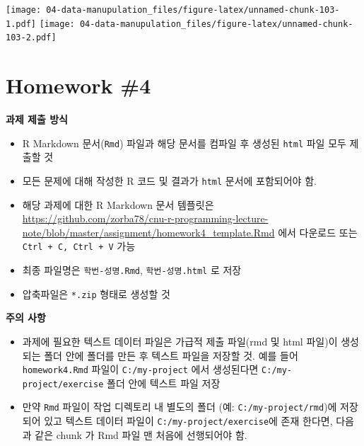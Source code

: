 \documentclass[
  11pt,
]{krantz}
\newenvironment{Shaded}{\begin{snugshade}}{\end{snugshade}}
\newcommand{\BaseNTok}[1]{\textcolor[rgb]{0.06,0.06,0.06}{#1}}
\providecommand{\tightlist}{%
  \setlength{\itemsep}{0pt}\setlength{\parskip}{0pt}}
\let\BeginKnitrBlock\begin \let\EndKnitrBlock\end
\begin{document}
\texttt{[image: 04-data-manupulation\_files/figure-latex/unnamed-chunk-103-1.pdf]} \texttt{[image: 04-data-manupulation\_files/figure-latex/unnamed-chunk-103-2.pdf]}

\normalsize

\hypertarget{homework-04}{%
\section{Homework \#4}\label{homework-04}}

\footnotesize

\BeginKnitrBlock{rmdimportant}
\textbf{과제 제출 방식}

\begin{itemize}
\tightlist
\item
  R Markdown 문서(\texttt{Rmd}) 파일과 해당 문서를 컴파일 후 생성된 \texttt{html} 파일 모두 제출할 것
\item
  모든 문제에 대해 작성한 R 코드 및 결과가 \texttt{html} 문서에 포함되어야 함.
\item
  해당 과제에 대한 R Markdown 문서 템플릿은 \url{https://github.com/zorba78/cnu-r-programming-lecture-note/blob/master/assignment/homework4_template.Rmd} 에서 다운로드 또는 \texttt{Ctrl\ +\ C,\ Ctrl\ +\ V} 가능
\item
  최종 파일명은 \texttt{학번-성명.Rmd}, \texttt{학번-성명.html} 로 저장
\item
  압축파일은 \texttt{*.zip} 형태로 생성할 것
\end{itemize}

\textbf{주의 사항}

\begin{itemize}
\tightlist
\item
  과제에 필요한 텍스트 데이터 파일은 가급적 제출 파일(rmd 및 html 파일)이 생성되는 폴더 안에 폴더를 만든 후 텍스트 파일을 저장할 것. 예를 들어 \texttt{homework4.Rmd} 파일이 \texttt{C:/my-project} 에서 생성된다면 \texttt{C:/my-project/exercise} 폴더 안에 텍스트 파일 저장
\item
  만약 \texttt{Rmd} 파일이 작업 디렉토리 내 별도의 폴더 (예: \texttt{C:/my-project/rmd})에 저장되어 있고 텍스트 데이터 파일이 \texttt{C:/my-project/exercise}에 존재 한다면, 다음과 같은 chunk 가 Rmd 파일 맨 처음에 선행되어야 함.
\end{itemize}
\EndKnitrBlock{rmdimportant}

\normalsize

\begin{Shaded}
\end{Shaded}
\end{document}
